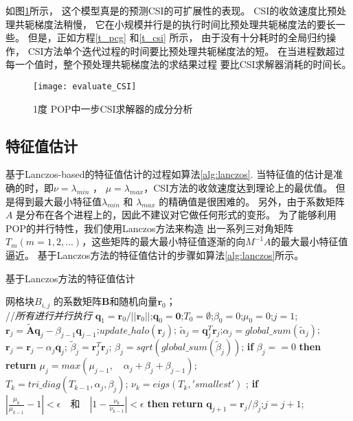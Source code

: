 如图\ref{fig:cst_ratio}所示， 这个模型真是的预测CSI的可扩展性的表现。 
CSI的收敛速度比预处理共轭梯度法稍慢， 它在小规模并行是的执行时间比预处理共轭梯度法的要长一些。 
但是，正如方程\ref{t_pcg} 和\ref{t_csi} 所示， 由于没有十分耗时的全局归约操作， CSI方法单个迭代过程的时间要比预处理共轭梯度法的短。 
在当进程数超过每一个值时，整个预处理共轭梯度法的求结果过程 要比CSI求解器消耗的时间长。 

 
\begin {figure}%
\centering
\texttt{[image: evaluate\_CSI]}
\caption[] { 1度 POP中一步CSI求解器的成分分析}
\label{fig:cst_ratio}
\end{figure}

\subsection{特征值估计}
\label{solver:eigs}
基于Lanczos-based的特征值估计的过程如算法\ref{alg:lanczos}.
当特征值的估计是准确的时，即$\nu = \lambda_{min}$ ， $\mu =\lambda_{max}$，CSI方法的收敛速度达到理论上的最优值。 
但是得到最大最小特征值$\lambda_{min}$ 和 $\lambda_{max}$ 的精确值是很困难的。
另外，由于系数矩阵$A$ 是分布在各个进程上的，因此不建议对它做任何形式的变形。  
为了能够利用POP的并行特性，我们使用Lanczos方法来构造 出一系列三对角矩阵$T_m (m=1,2,...)$，这些矩阵的最大最小特征值逐渐的向$M^{-1}A$的最大最小特征值逼近。
基于Lanczos方法的特征值估计的步骤如算法\ref{alg:lanczos}所示。 
\begin{algorithm}
\caption{ 基于Lanczos方法的特征值估计}
\label{alg:lanczos}
\begin{algorithmic}[1]
\REQUIRE  网格块$B_{i,j}$ 的系数矩阵$\textbf{B}$和随机向量$\textbf{r}_0$；\\
 //\qquad    \textit{所有进行并行执行}
\STATE $\textbf{q}_1 = \textbf{r}_0/||\textbf{r}_0||$;\quad $\textbf{q}_0=\textbf{0}$;\quad $T_0=\emptyset$;\quad $\beta_0 =0$;\quad  $\mu_0 =0$;\quad $j=1$;
\STATE $\textbf{r}_j=\tilde{\textbf{A}}\textbf{q}_j-\beta_{j-1}\textbf{q}_{j-1}$;\quad $update\_halo(\textbf{r}_j)$;
\STATE $\tilde{\alpha}_j =\textbf{q}_j^T\textbf{r}_j$;\quad $\alpha_j=global\_sum(\tilde{\alpha}_j)$; 
\STATE $\textbf{r}_j=\textbf{r}_j-\alpha_{j}\textbf{q}_{j}$;
\STATE $\tilde{\beta}_j = \textbf{r}_j^T\textbf{r}_j$; \quad $\beta_j=sqrt(global\_sum(\tilde{\beta}_j))$;
\STATE \textbf{if} $\beta_j == 0$ \textbf{then} \textbf{return}
\STATE $\mu_j = max(\mu_{j-1}, \quad \alpha_j+\beta_j+\beta_{j-1})$; \label{lanczos_gersh} \\
\STATE $T_k=tri\_diag(T_{k-1},\alpha_j,\beta_j)$; \quad $\nu_k = eigs(T_k,'smallest')$ ; \label{lanczos_tridiag} 
\STATE \textbf{if} $|\frac{\mu_k}{\mu_{k-1}} -1 |< \epsilon\quad\textbf{和}\quad|1- \frac{\nu_k}{\nu_{k-1}}|< \epsilon$ \textbf{then} \textbf{return}
\STATE $\textbf{q}_{j+1}= \textbf{r}_j/\beta_j$;\quad $j=j+1$;
\ENDWHILE
\end{algorithmic}
\end{algorithm}
 
